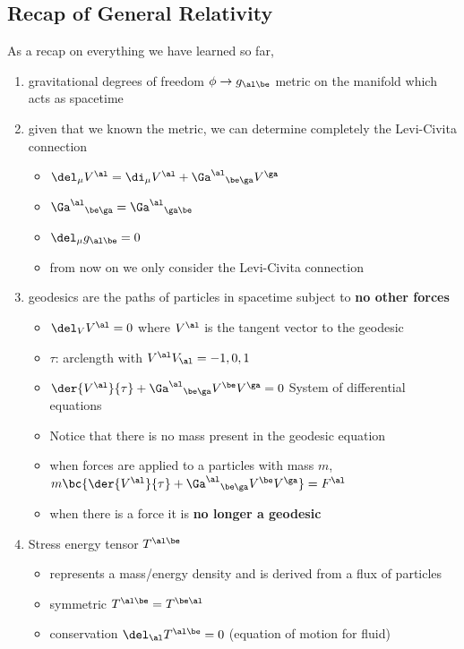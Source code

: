 \documentclass{article}
\begin{document}
\subsection{Recap of General Relativity}
As a recap on everything we have learned so far,
\begin{enumerate}
    \item gravitational degrees of freedom $\phi \to g_{\al\be}$ metric on the manifold which acts as spacetime
    \item given that we known the metric, we can determine completely the Levi-Civita connection
    \begin{itemize}
        \item $\del_\mu V^\al = \di_\mu V^\al + {\Ga^\al}_{\be\ga}V^\ga$
        \item ${\Ga^\al}_{\be\ga} = {\Ga^\al}_{\ga\be}$
        \item $\del_\mu g_{\al\be} = 0$
        \item from now on we only consider the Levi-Civita connection
    \end{itemize}
    \item geodesics are the paths of particles in spacetime subject to \textbf{no other forces}
    \begin{itemize}
        \item $\del_V V^\al = 0$ where $V^\al$ is the tangent vector to the geodesic
        \item $\tau$: arclength with $V^\al V_\al = -1, 0, 1$
        \item $\der{V^\al}{\tau} + {\Ga^\al}_{\be\ga} V^\be V^\ga = 0$ System of differential equations
        \item Notice that there is no mass present in the geodesic equation
        \item when forces are applied to a particles with mass $m$, $m\bc{\der{V^\al}{\tau} + {\Ga^\al}_{\be\ga} V^\be V^\ga} = F^\al$
        \item when there is a force it is \textbf{no longer a geodesic}
    \end{itemize}
    \item Stress energy tensor $T^{\al\be}$
    \begin{itemize}
        \item represents a mass/energy density and is derived from a flux of particles
        \item symmetric $T^{\al\be} = T^{\be\al}$
        \item conservation $\del_\al T^{\al\be} = 0$ (equation of motion for fluid)

\end{itemize}
\end{enumerate}
\end{document}
